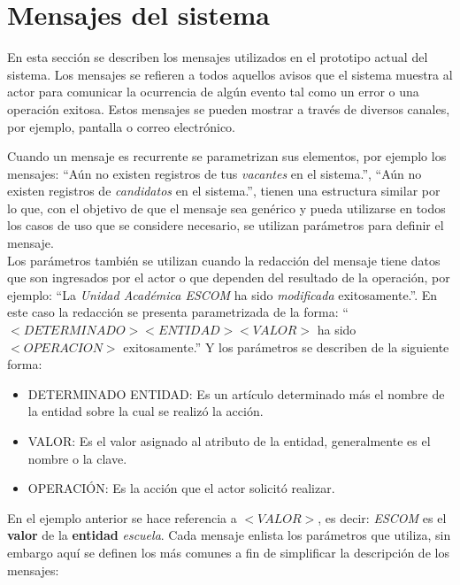 \clearpage
\chapter{Mensajes del sistema}

En esta sección se describen los mensajes utilizados en el prototipo actual del sistema.
Los mensajes se refieren a todos aquellos avisos que el sistema muestra al actor para comunicar la ocurrencia de algún evento 
tal como un error o una operación exitosa. Estos mensajes se pueden mostrar a través de diversos canales, por ejemplo, pantalla 
o correo electrónico.

Cuando un mensaje es recurrente se parametrizan sus elementos, por ejemplo los mensajes: ``Aún no existen registros de tus
\textit{vacantes} en el sistema.'', ``Aún no existen registros de \textit{candidatos} en el sistema.'', 
tienen una estructura similar por lo que, con el objetivo de que el mensaje sea genérico y pueda utilizarse en todos los 
casos de uso que se considere necesario, se utilizan parámetros para definir el mensaje.\\

Los parámetros también se utilizan cuando la redacción del mensaje tiene datos que son ingresados por el actor o que dependen del 
resultado de la operación, por ejemplo: 
``La \textit{Unidad Académica ESCOM} ha sido \textit{modificada} exitosamente.''. 
En este caso la redacción se presenta parametrizada de la forma: \newline
``$<DETERMINADO> <ENTIDAD> <VALOR>$ ha sido $<OPERACION>$ exitosamente.'' \newline
Y los parámetros se describen de la siguiente forma:

\begin{itemize}
	\item DETERMINADO ENTIDAD: Es un artículo determinado más el nombre de la entidad sobre la cual se realizó la acción.
	\item VALOR: Es el valor asignado al atributo de la entidad, generalmente es el nombre o la clave.
	\item OPERACIÓN: Es la acción que el actor solicitó realizar.
\end{itemize}

En el ejemplo anterior se hace referencia a $<VALOR>$, es decir: \textit{ESCOM} es el \textbf{valor} de la \textbf{entidad} 
\textit{escuela}. Cada mensaje enlista los parámetros  que utiliza, sin embargo aquí se definen los más comunes a fin de 
simplificar la descripción de los mensajes:

